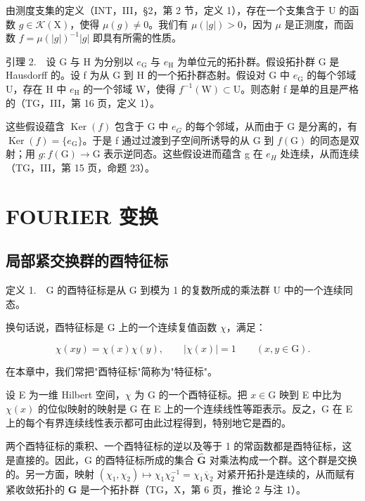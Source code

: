 由测度支集的定义（INT，III，§2，第 2 节，定义 1），存在一个支集含于 U 的函数 \(g \in \mathcal{K}(\mathrm{X})\)，使得 \(\mu(g) \neq 0\)。我们有 \(\mu(|g|) > 0\)，因为 \(\mu\) 是正测度，而函数 \(f = \mu(|g|)^{-1}|g|\) 即具有所需的性质。

引理 2.　设 G 与 H 为分别以 \(e_{\mathrm{G}}\) 与 \(e_{\mathrm{H}}\) 为单位元的拓扑群。假设拓扑群 G 是 Hausdorff 的。设 f 为从 G 到 H 的一个拓扑群态射。假设对 G 中 \(e_{\mathrm{G}}\) 的每个邻域 U，存在 H 中 \(e_{\mathrm{H}}\) 的一个邻域 W，使得 \(f^{-1}(\mathrm{W}) \subset \mathrm{U}\)。则态射 f 是单的且是严格的（TG，III，第 16 页，定义 1）。

这些假设蕴含 \(\operatorname{Ker}(f)\) 包含于 G 中 \(e_{G}\) 的每个邻域，从而由于 G 是分离的，有 \(\operatorname{Ker}(f) = \{e_{\mathrm{G}}\}\)。于是 f 通过过渡到子空间所诱导的从 G 到 \(f(\mathrm{G})\) 的同态是双射；用 \(g: f(\mathrm{G}) \to \mathrm{G}\) 表示逆同态。这些假设进而蕴含 g 在 \(e_{H}\) 处连续，从而连续（TG，III，第 15 页，命题 23）。

\section{FOURIER 变换}

\subsection{局部紧交换群的酉特征标}

定义 1.　G 的酉特征标是从 G 到模为 1 的复数所成的乘法群 U 中的一个连续同态。

换句话说，酉特征标是 G 上的一个连续复值函数 \(\chi\)，满足：

\[
\chi (x y) = \chi (x) \chi (y), \qquad | \chi (x) | = 1 \qquad (x, y \in \mathrm{G}).
\]

在本章中，我们常把"酉特征标"简称为"特征标"。

设 E 为一维 Hilbert 空间，\(\chi\) 为 G 的一个酉特征标。把 \(x \in \mathrm{G}\) 映到 E 中比为 \(\chi(x)\) 的位似映射的映射是 G 在 E 上的一个连续线性等距表示。反之，G 在 E 上的每个有界连续线性表示都可由此过程得到，特别地它是酉的。

两个酉特征标的乘积、一个酉特征标的逆以及等于 1 的常函数都是酉特征标，这是直接的。因此，G 的酉特征标所成的集合 \(\widehat{\mathbf{G}}\) 对乘法构成一个群。这个群是交换的。另一方面，映射 \((\chi_1,\chi_2)\mapsto \chi_1\chi_2^{-1} = \chi_1\overline{\chi}_2\) 对紧开拓扑是连续的，从而赋有紧收敛拓扑的 \(\widehat{\mathbf{G}}\) 是一个拓扑群（TG，X，第 6 页，推论 2 与注 1）。

